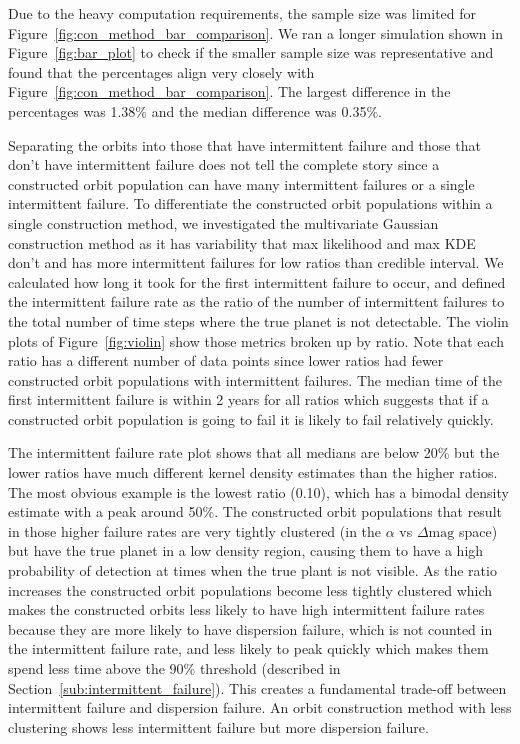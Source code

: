 Due to the heavy computation requirements, the sample size was limited for
Figure~\ref{fig:con_method_bar_comparison}. We ran a longer simulation shown in
Figure~\ref{fig:bar_plot} to check if the smaller sample size was representative and found that the
percentages align very closely with Figure~\ref{fig:con_method_bar_comparison}. The largest
difference in the percentages was 1.38\% and the median difference was 0.35\%.

Separating the orbits into those that have intermittent failure and those that don't have intermittent failure does not tell
the complete story since a constructed orbit population can have many intermittent failures or a
single intermittent failure.  To differentiate the constructed orbit populations within a single
construction method, we investigated the multivariate Gaussian construction method as it has
variability that max likelihood and max KDE don't and has more intermittent failures for low ratios
than credible interval.  We calculated how long it took for the first intermittent failure to
occur, and defined the intermittent failure rate as the ratio of the number of intermittent failures
to the total number of time steps where the true planet is not detectable. The violin plots of
Figure~\ref{fig:violin} show those metrics broken up by ratio.  Note that each ratio has a different
number of data points since lower ratios had fewer constructed orbit populations with intermittent
failures. The median time of the first intermittent failure is within 2 years for all ratios which
suggests that if a constructed orbit population is going to fail it is likely to fail relatively
quickly. 

The intermittent failure rate plot shows that all medians are below 20\% but the lower ratios have
much different kernel density estimates than the higher ratios. The most obvious example is the
lowest ratio (0.10), which has a bimodal density estimate with a peak around 50\%. The constructed
orbit populations that result in those higher failure rates are very tightly clustered (in the
$\alpha$ vs $\Delta \textrm{mag}$ space) but have the true planet in a low density region, causing
them to have a high probability of detection at times when the true plant is not visible. As the ratio
increases the constructed orbit populations become less tightly clustered which makes the
constructed orbits less likely to have high intermittent failure rates because they are more likely
to have dispersion failure, which is not counted in the intermittent failure rate, and less likely
to peak quickly which makes them spend less time above the 90\% threshold (described in
Section~\ref{sub:intermittent_failure}).  This creates a
fundamental trade-off between intermittent failure and dispersion failure. An orbit construction
method with less clustering shows less intermittent failure but more dispersion failure.

